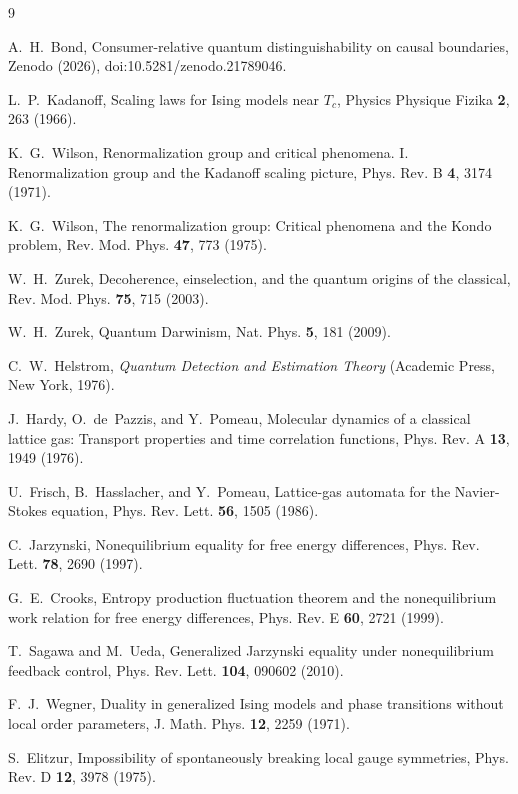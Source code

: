 \documentclass[aps,pre,reprint,nofootinbib,floatfix]{revtex4-2}
\begin{document}
\begin{thebibliography}{9}

A.~H.~Bond,
Consumer-relative quantum distinguishability on causal boundaries,
Zenodo (2026), doi:10.5281/zenodo.21789046.

L.~P.~Kadanoff,
Scaling laws for Ising models near $T_c$,
Physics Physique Fizika \textbf{2}, 263 (1966).

K.~G.~Wilson,
Renormalization group and critical phenomena. I. Renormalization
group and the Kadanoff scaling picture,
Phys. Rev. B \textbf{4}, 3174 (1971).

K.~G.~Wilson,
The renormalization group: Critical phenomena and the Kondo
problem,
Rev. Mod. Phys. \textbf{47}, 773 (1975).

W.~H.~Zurek,
Decoherence, einselection, and the quantum origins of the
classical,
Rev. Mod. Phys. \textbf{75}, 715 (2003).

W.~H.~Zurek,
Quantum Darwinism,
Nat. Phys. \textbf{5}, 181 (2009).

C.~W.~Helstrom,
\emph{Quantum Detection and Estimation Theory}
(Academic Press, New York, 1976).

J.~Hardy, O.~de~Pazzis, and Y.~Pomeau,
Molecular dynamics of a classical lattice gas: Transport
properties and time correlation functions,
Phys. Rev. A \textbf{13}, 1949 (1976).

U.~Frisch, B.~Hasslacher, and Y.~Pomeau,
Lattice-gas automata for the Navier-Stokes equation,
Phys. Rev. Lett. \textbf{56}, 1505 (1986).

C.~Jarzynski,
Nonequilibrium equality for free energy differences,
Phys. Rev. Lett. \textbf{78}, 2690 (1997).

G.~E.~Crooks,
Entropy production fluctuation theorem and the nonequilibrium work
relation for free energy differences,
Phys. Rev. E \textbf{60}, 2721 (1999).

T.~Sagawa and M.~Ueda,
Generalized Jarzynski equality under nonequilibrium feedback
control,
Phys. Rev. Lett. \textbf{104}, 090602 (2010).

F.~J.~Wegner,
Duality in generalized Ising models and phase transitions without
local order parameters,
J. Math. Phys. \textbf{12}, 2259 (1971).

S.~Elitzur,
Impossibility of spontaneously breaking local gauge symmetries,
Phys. Rev. D \textbf{12}, 3978 (1975).


\end{thebibliography}
\end{document}

